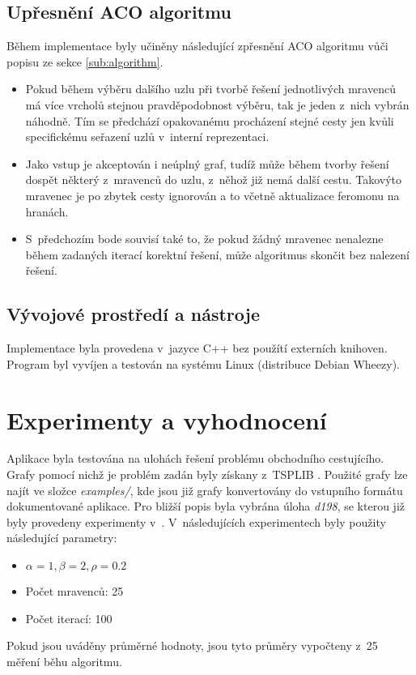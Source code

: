 \documentclass[a4paper, 12pt]{article}
\begin{document}
\subsection{Upřesnění ACO algoritmu}
Během implementace byly učiněny následující zpřesnění ACO algoritmu vůči popisu ze sekce \ref{sub:algorithm}.
\begin{itemize}
  \item Pokud během výběru dalšího uzlu při tvorbě řešení jednotlivých mravenců má více vrcholů stejnou pravděpodobnost výběru, tak je jeden z~nich vybrán náhodně.
  Tím se předchází opakovanému procházení stejné cesty jen kvůli specifickému seřazení uzlů v~interní reprezentaci.
  \item Jako vstup je akceptován i neúplný graf, tudíž může během tvorby řešení dospět některý z~mravenců do uzlu, z~něhož již nemá další cestu. Takovýto mravenec
  je po zbytek cesty ignorován a to včetně aktualizace feromonu na hranách.
  \item S~předchozím bode souvisí také to, že pokud žádný mravenec nenalezne během zadaných iterací korektní řešení, může algoritmus skončit bez nalezení
  řešení.
\end{itemize}

\subsection{Vývojové prostředí a nástroje}
Implementace byla provedena v~jazyce C++ bez použítí externích knihoven. Program byl vyvíjen a testován na systému Linux (distribuce Debian Wheezy).

\section{Experimenty a vyhodnocení}
\label{sec:eval}
Aplikace byla testována na ulohách řešení problému obchodního cestujícího. Grafy pomocí nichž je problém zadán byly získany z~TSPLIB \cite{TSPLIB}.
Použité grafy lze najít ve složce \emph{examples/}, kde jsou již grafy konvertovány do vstupního formátu dokumentované aplikace. Pro bližší popis
byla vybrána úloha \emph{d198}, se kterou již byly provedeny experimenty v~\cite{aco:maxmintsp,aco:acs}. V~následujících experimentech byly použity následující
parametry:
  \begin{itemize}
    \item $\alpha=1, \beta=2, \rho=0.2$
    \item Počet mravenců: 25
    \item Počet iterací: 100
  \end{itemize}
Pokud jsou uváděny průměrné hodnoty, jsou tyto průměry vypočteny z~25 měření běhu algoritmu.
\end{document}
